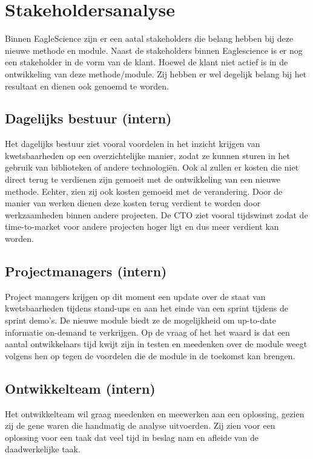 \section{Stakeholdersanalyse}\label{sec:stakeholdersanalyse}
Binnen EagleScience zijn er een aatal stakeholders die belang hebben bij deze nieuwe methode en module. Naast de stakeholders binnen Eaglescience is er nog een stakeholder in de vorm van de klant. Hoewel de klant niet actief is in de ontwikkeling van deze methode/module. Zij hebben er wel degelijk belang bij het resultaat en dienen ook genoemd te worden.

\subsection{Dagelijks bestuur (intern)}\label{subsec:dagelijks-bestuur-(intern)1}
Het dagelijks bestuur ziet vooral voordelen in het inzicht krijgen van kwetsbaarheden op een overzichtelijke manier, zodat ze kunnen sturen in het gebruik van biblioteken of andere technologiën. Ook al zullen er kosten die niet direct terug te verdienen zijn gemoeit met de ontwikkeling van een nieuwe methode.
Echter, zien zij ook kosten gemoeid met de verandering.
Door de manier van werken dienen deze kosten terug verdient te worden door werkzaamheden binnen andere projecten.
De CTO ziet vooral tijdswinst zodat de time-to-market voor andere projecten hoger ligt en dus meer verdient kan worden.

\subsection{Projectmanagers (intern)}\label{subsec:projectmanagers-(intern)1}
Project managers krijgen op dit moment een update over de staat van kwetsbaarheden tijdens stand-ups en aan het einde van een sprint tijdens de sprint demo's.
De nieuwe module biedt ze de mogelijkheid om up-to-date informatie on-demand te verkrijgen.
Op de vraag of het het waard is dat een aantal ontwikkelaars tijd kwijt zijn in testen en meedenken over de module weegt volgens hen op tegen de voordelen die de module in de toekomst kan brengen.

\subsection{Ontwikkelteam (intern)}\label{subsec:ontwikkelteam-(intern)1}
Het ontwikkelteam wil graag meedenken en meewerken aan een oplossing, gezien zij de gene waren die handmatig de analyse uitvoerden.
Zij zien voor een oplossing voor een taak dat veel tijd in beslag nam en afleide van de daadwerkelijke taak.

